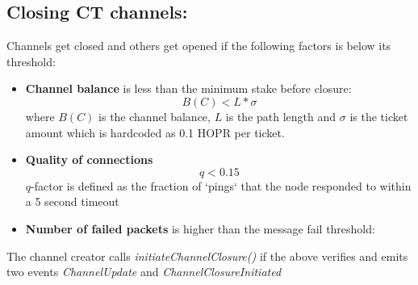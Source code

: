 \subsection{Closing CT channels:}
Channels get closed and others get opened if the following factors is below its threshold:
  \begin{itemize}
      \item \textbf{Channel balance} is less than the minimum stake before closure:
      $$B(C) < L * \sigma$$
      where $B(C)$ is the channel balance, $L$ is the path length and $\sigma$ is the ticket amount which is hardcoded as 0.1 HOPR per ticket.
      \item \textbf{Quality of connections}
      $$q < 0.15$$ $q$-factor is defined as the fraction of `pings` that the node responded to within a 5 second timeout
      \item \textbf{Number of failed packets} is higher than the message fail threshold:
      $$ $$
  \end{itemize}
The channel creator calls \textit{initiateChannelClosure()} if the above verifies and emits two events \textit{ChannelUpdate} and \textit{ChannelClosureInitiated}
